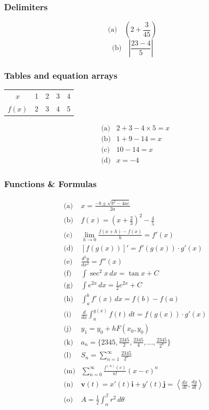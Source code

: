 \documentclass{article}
\begin{document}
\subsubsection{Delimiters}
\[
    \text{(a)} \quad \left( 2 + \frac{3}{45} \right)
\]
\[
    \text{(b)} \quad \left| \frac{23 - 4}{5} \right|
\]

\subsubsection{Tables and equation arrays}
\begin{center}
    \begin{tabular}{c c c c c}
        $x$ & 1 & 2 & 3 & 4 \\
        $f(x)$ & 2 & 3 & 4 & 5 \\
    \end{tabular}
\end{center}

\begin{align}
    &\text{(a)} & 2 + 3 - 4 \times 5 = x \\
    &\text{(b)} & 1 + 9 - 14 = x \\
    &\text{(c)} & 10 - 14 = x \\
    &\text{(d)} & x = -4
\end{align}

\subsubsection{Functions \& Formulas}
\begin{align*}
    &\text{(a)} & x = \frac{-b \pm \sqrt{b^2 - 4ac}}{2a} \\
    &\text{(b)} & f(x) = \left( x + \frac{2}{3} \right)^2 - \frac{4}{5} \\
    &\text{(c)} & \lim_{h \to 0} \frac{f(x+h) - f(x)}{h} = f'(x) \\
    &\text{(d)} & [f(g(x))]' = f'(g(x)) \cdot g'(x) \\
    &\text{(e)} & \frac{d^2 y}{dx^2} = f''(x) \\
    &\text{(f)} & \int \sec^2 x \, dx = \tan x + C \\
    &\text{(g)} & \int e^{2x} \, dx = \frac{1}{2} e^{2x} + C \\
    &\text{(h)} & \int_{a}^{b} f'(x) \, dx = f(b) - f(a) \\
    &\text{(i)} & \frac{d}{dx} \int_{a}^{g(x)} f(t) \, dt = f(g(x)) \cdot g'(x) \\
    &\text{(j)} & y_1 = y_0 + hF(x_0, y_0) \\
    &\text{(k)} & a_n = \{2345, \frac{2345}{2}, \frac{2345}{4}, \ldots, \frac{2345}{2^n}\} \\
    &\text{(l)} & S_n = \sum_{n=1}^{\infty} \frac{2345}{2^n} \\
    &\text{(m)} & \sum_{n=0}^{\infty} \frac{f^{(n)}(c)}{n!} (x-c)^n \\
    &\text{(n)} & \mathbf{v}(t) = x'(t) \mathbf{i} + y'(t) \mathbf{j} = \left\langle \frac{dx}{dt}, \frac{dy}{dt} \right\rangle \\
    &\text{(o)} & A = \frac{1}{2} \int_{\alpha}^{\beta} r^2 \, d\theta \\
\end{align*}
\newpage
\end{document}
